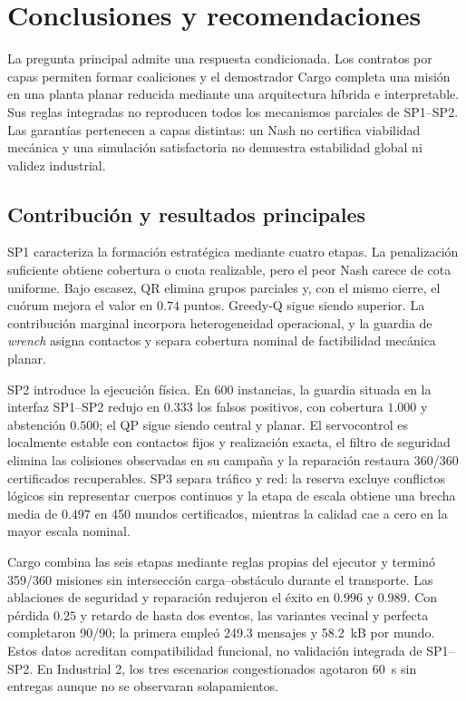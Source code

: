 \section{Conclusiones y recomendaciones}
\label{sec:conclusions}

La pregunta principal admite una respuesta condicionada. Los contratos por
capas permiten formar coaliciones y el demostrador Cargo completa una misión en
una planta planar reducida mediante una arquitectura híbrida e interpretable.
Sus reglas integradas no reproducen todos los mecanismos parciales de SP1--SP2. Las
garantías pertenecen a capas distintas: un Nash no certifica viabilidad mecánica
y una simulación satisfactoria no demuestra estabilidad global ni validez
industrial.

\subsection{Contribución y resultados principales}

SP1 caracteriza la formación estratégica mediante cuatro etapas. La penalización suficiente obtiene cobertura o cuota realizable, pero el peor Nash carece de cota uniforme. Bajo escasez, QR elimina grupos parciales y, con el mismo cierre, el cuórum mejora el valor en $0.74$ puntos. Greedy-Q sigue siendo superior. La contribución marginal incorpora heterogeneidad operacional, y la guardia de \emph{wrench} asigna contactos y separa cobertura nominal de factibilidad mecánica planar.

SP2 introduce la ejecución física. En 600 instancias, la guardia situada en la interfaz SP1--SP2 redujo en $0.333$ los falsos positivos, con cobertura $1.000$ y abstención $0.500$; el QP sigue siendo central y planar. El servocontrol es localmente estable con contactos fijos y realización exacta, el filtro de seguridad elimina las colisiones observadas en su campaña y la reparación restaura 360/360 certificados recuperables. SP3 separa tráfico y red: la reserva excluye conflictos lógicos sin representar cuerpos continuos y la etapa de escala obtiene una brecha media de $0.497$ en 450 mundos certificados, mientras la calidad cae a cero en la mayor escala nominal.

Cargo combina las seis etapas mediante reglas propias del ejecutor y terminó
359/360 misiones sin intersección carga--obstáculo durante el transporte. Las
ablaciones de seguridad y reparación redujeron el éxito en $0.996$ y $0.989$.
Con pérdida $0.25$ y retardo de hasta dos eventos, las variantes vecinal y perfecta
completaron 90/90; la primera empleó 249.3 mensajes y 58.2~kB por mundo. Estos
datos acreditan compatibilidad funcional, no validación integrada de SP1--SP2.
En Industrial 2, los tres escenarios congestionados agotaron $60$~s sin entregas
aunque no se observaran solapamientos.

